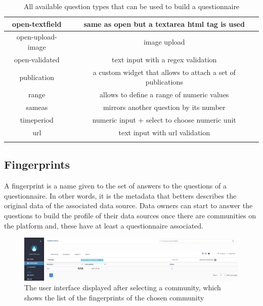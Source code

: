 \begin{longtable}[c]{|c|c|}
open-textfield            & same as open but a textarea html tag is used                \\ \hline
open-upload-image         & image upload                                                \\ \hline
open-validated            & text input with a regex validation                          \\ \hline
publication               & a custom widget that allows to attach a set of publications \\ \hline
range                     & allows to define a range of numeric values                  \\ \hline
sameas                    & mirrors another question by its number                      \\ \hline
timeperiod                & numeric input + select to choose numeric unit               \\ \hline
url                       & text input with url validation                              \\ \hline
\caption{All available question types that can be used to build a questionnaire}
\label{tab:my-table}\\
\end{longtable}

\subsection{Fingerprints}


A fingerprint is a name given to the set of answers to the questions of a questionnaire.
In other words, it is the metadata that betters describes the original data of the associated data source.
Data owners can start to answer the questions to build the profile of their data sources once there are communities on the platform and, these have at least a questionnaire associated.

\begin{figure}[h]
    \center
    \includegraphics[width=\textwidth]{listings}
    \caption{The user interface displayed after selecting a community, which shows the list of the fingerprints of the chosen community}
    \label{fig:listings}
\end{figure}

